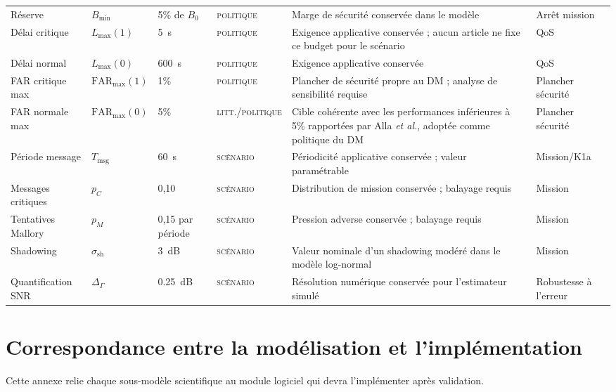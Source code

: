 \documentclass[conference,a4paper]{IEEEtran}
\newcommand{\statusLit}{\textsc{litt.}}
\newcommand{\statusScen}{\textsc{scénario}}
\newcommand{\statusPol}{\textsc{politique}}
\newcommand{\FAR}{\mathrm{FAR}}
\begin{document}
\begin{table}[H]
\begin{tabularx}{\textwidth}{@{}l l l l Y Y@{}}
Réserve & $B_{\min}$ & 5\% de $B_0$ & \statusPol{} & Marge de sécurité conservée dans le modèle & Arrêt mission \\
Délai critique & $L_{\max}(1)$ & \SI{5}{s} & \statusPol{} & Exigence applicative conservée ; aucun article ne fixe ce budget pour le scénario & QoS \\
Délai normal & $L_{\max}(0)$ & \SI{600}{s} & \statusPol{} & Exigence applicative conservée & QoS \\
FAR critique max & $\FAR_{\max}(1)$ & 1\% & \statusPol{} & Plancher de sécurité propre au DM ; analyse de sensibilité requise & Plancher sécurité \\
FAR normale max & $\FAR_{\max}(0)$ & 5\% & \statusLit{}/\statusPol{} & Cible cohérente avec les performances inférieures à 5\% rapportées par Alla \emph{et al.}, adoptée comme politique du DM \cite{alla2024} & Plancher sécurité \\
Période message & $T_{\mathrm{msg}}$ & \SI{60}{s} & \statusScen{} & Périodicité applicative conservée ; valeur paramétrable & Mission/K1a \\
Messages critiques & $p_C$ & 0,10 & \statusScen{} & Distribution de mission conservée ; balayage requis & Mission \\
Tentatives Mallory & $p_M$ & 0,15 par période & \statusScen{} & Pression adverse conservée ; balayage requis & Mission \\
Shadowing & $\sigma_{\mathrm{sh}}$ & \SI{3}{dB} & \statusScen{} & Valeur nominale d'un shadowing modéré dans le modèle log-normal \cite[Chap.~4]{rappaport2002} & Mission \\
Quantification SNR & $\Delta_{\Gamma}$ & \SI{0.25}{dB} & \statusScen{} & Résolution numérique conservée pour l'estimateur simulé & Robustesse à l'erreur \\
\bottomrule
\end{tabularx}
\end{table}

\section{Correspondance entre la modélisation et l'implémentation}
\label{ann:implementation}
Cette annexe relie chaque sous-modèle scientifique au module logiciel qui devra l'implémenter après validation.
\end{document}
